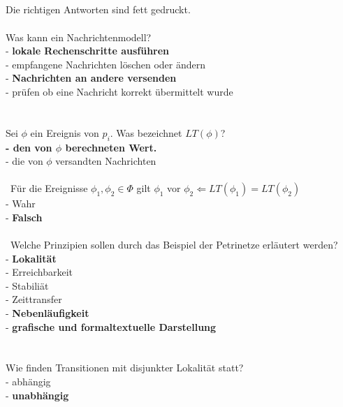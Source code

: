 \documentclass[a4paper,12pt]{scrartcl}
\begin{document}
\subsection{}
\subsubsection{}
Die richtigen Antworten sind fett gedruckt.\\\\
Was kann ein Nachrichtenmodell?\\
- \textbf{lokale Rechenschritte ausführen}\\
- empfangene Nachrichten löschen oder ändern\\
- \textbf{Nachrichten an andere versenden}\\
- prüfen ob eine Nachricht korrekt übermittelt wurde\\\\\\
Sei $\phi$ ein Ereignis von $p_i$. Was bezeichnet $LT(\phi)$?\\
\textbf{- den von $\phi$ berechneten Wert.\\}
- die von $\phi$ versandten Nachrichten\\
\\\
Für die Ereignisse $\phi_1 ,\phi_2\in\Phi$ gilt $\phi_1$ vor $\phi_2\Leftarrow LT(\phi_1)=LT(\phi_2)$\\
- Wahr\\
- \textbf{Falsch}\\\\\
Welche Prinzipien sollen durch das Beispiel der Petrinetze erläutert werden?\\
- \textbf{Lokalität}\\
- Erreichbarkeit\\
- Stabiliät\\
- Zeittransfer\\
- \textbf{Nebenläufigkeit}\\
- \textbf{grafische und formaltextuelle Darstellung}\\\\\\
Wie finden Transitionen mit disjunkter Lokalität statt?\\
- abhängig\\
- \textbf{unabhängig}\\
\end{document}
